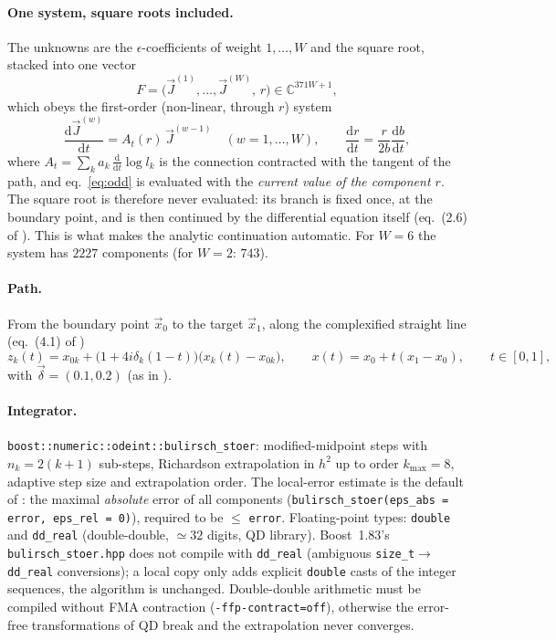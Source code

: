 \documentclass[11pt,a4paper]{article}
\newcommand{\eps}{\epsilon}
\begin{document}
\paragraph{One system, square roots included.}
The unknowns are the $\eps$-coefficients of weight $1,\dots,W$ and the square root, stacked into one vector
\begin{equation}
 F=\big(\vec J^{(1)},\dots,\vec J^{(W)},\,r\big)\in\mathbb C^{371W+1},
\end{equation}
which obeys the first-order (non-linear, through $r$) system
\begin{equation}\label{eq:system}
 \frac{\mathrm d\vec J^{(w)}}{\mathrm dt}=A_t(r)\,\vec J^{(w-1)}\quad(w=1,\dots,W),\qquad
 \frac{\mathrm dr}{\mathrm dt}=\frac{r}{2b}\frac{\mathrm db}{\mathrm dt},
\end{equation}
where $A_t=\sum_k a_k\,\frac{\mathrm d}{\mathrm dt}\log l_k$ is the connection contracted with the tangent of the path,
and eq.~\eqref{eq:odd} is evaluated with the \emph{current value of the component $r$}.  The square root is therefore never
evaluated: its branch is fixed once, at the boundary point, and is then continued by the differential equation
itself (eq.~(2.6) of \cite{CT}).  This is what makes the analytic continuation automatic.
For $W=6$ the system has $2227$ components (for $W=2$: $743$).

\paragraph{Path.}
From the boundary point $\vec x_0$ to the target $\vec x_1$, along the complexified straight line (eq.~(4.1) of \cite{CT})
\begin{equation}
 z_k(t)=x_{0k}+\big(1+4i\delta_k(1-t)\big)\big(x_k(t)-x_{0k}\big),\qquad x(t)=x_0+t(x_1-x_0),\qquad t\in[0,1],
\end{equation}
with $\vec\delta=(0.1,0.2)$ (as in \cite{CT}).

\paragraph{Integrator.}
\texttt{boost::numeric::odeint::bulirsch\_stoer}: modified-midpoint steps with $n_k=2(k+1)$ sub-steps,
Richardson extrapolation in $h^2$ up to order $k_{\max}=8$, adaptive step size and extrapolation order.
The local-error estimate is the default of \cite{CT}: the maximal \emph{absolute} error of all components
(\texttt{bulirsch\_stoer(eps\_abs = error, eps\_rel = 0)}), required to be $\le$ \texttt{error}.
Floating-point types: \texttt{double} and \texttt{dd\_real} (double-double, $\simeq 32$ digits, QD library).
Boost~1.83's \texttt{bulirsch\_stoer.hpp} does not compile with \texttt{dd\_real} (ambiguous
\texttt{size\_t}$\to$\texttt{dd\_real} conversions); a local copy only adds explicit \texttt{double} casts of the
integer sequences, the algorithm is unchanged.  Double-double arithmetic must be compiled without FMA contraction
(\texttt{-ffp-contract=off}), otherwise the error-free transformations of QD break and the extrapolation never converges.
\end{document}
